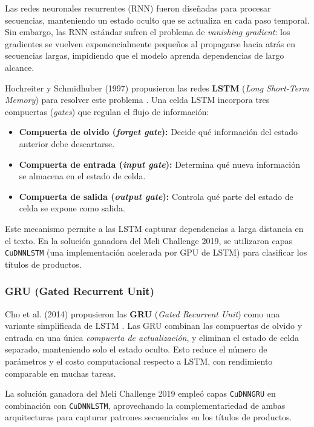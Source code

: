 \documentclass[11pt,a4paper]{article}
\begin{document}
Las redes neuronales recurrentes (RNN) fueron diseñadas para procesar secuencias, manteniendo un estado oculto que se actualiza en cada paso temporal. Sin embargo, las RNN estándar sufren el problema de \emph{vanishing gradient}: los gradientes se vuelven exponencialmente pequeños al propagarse hacia atrás en secuencias largas, impidiendo que el modelo aprenda dependencias de largo alcance.

Hochreiter y Schmidhuber (1997) propusieron las redes \textbf{LSTM} (\textit{Long Short-Term Memory}) para resolver este problema \cite{hochreiter1997}. Una celda LSTM incorpora tres compuertas (\textit{gates}) que regulan el flujo de información:

\begin{itemize}
    \item \textbf{Compuerta de olvido (\textit{forget gate}):} Decide qué información del estado anterior debe descartarse.
    \item \textbf{Compuerta de entrada (\textit{input gate}):} Determina qué nueva información se almacena en el estado de celda.
    \item \textbf{Compuerta de salida (\textit{output gate}):} Controla qué parte del estado de celda se expone como salida.
\end{itemize}

Este mecanismo permite a las LSTM capturar dependencias a larga distancia en el texto. En la solución ganadora del Meli Challenge 2019, se utilizaron capas \texttt{CuDNNLSTM} (una implementación acelerada por GPU de LSTM) para clasificar los títulos de productos.

\subsubsection{GRU (Gated Recurrent Unit)}

Cho et al. (2014) propusieron las \textbf{GRU} (\textit{Gated Recurrent Unit}) como una variante simplificada de LSTM \cite{cho2014}. Las GRU combinan las compuertas de olvido y entrada en una única \emph{compuerta de actualización}, y eliminan el estado de celda separado, manteniendo solo el estado oculto. Esto reduce el número de parámetros y el costo computacional respecto a LSTM, con rendimiento comparable en muchas tareas.

La solución ganadora del Meli Challenge 2019 empleó capas \texttt{CuDNNGRU} en combinación con \texttt{CuDNNLSTM}, aprovechando la complementariedad de ambas arquitecturas para capturar patrones secuenciales en los títulos de productos.
\end{document}
